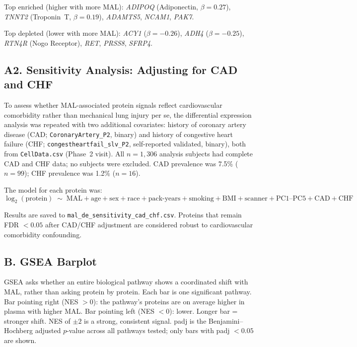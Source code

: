 \documentclass[11pt, letterpaper]{article}
\begin{document}
Top enriched (higher with more MAL):
\textit{ADIPOQ} (Adiponectin, $\beta = 0.27$),
\textit{TNNT2} (Troponin~T, $\beta = 0.19$),
\textit{ADAMTS5}, \textit{NCAM1}, \textit{PAK7}.

Top depleted (lower with more MAL):
\textit{ACY1} ($\beta = -0.26$), \textit{ADH4} ($\beta = -0.25$),
\textit{RTN4R} (Nogo Receptor), \textit{RET}, \textit{PRSS8},
\textit{SFRP4}.

\subsection*{A2. Sensitivity Analysis: Adjusting for CAD and CHF}

To assess whether MAL-associated protein signals reflect cardiovascular
comorbidity rather than mechanical lung injury per se, the differential
expression analysis was repeated with two additional covariates: history
of coronary artery disease (CAD; \texttt{CoronaryArtery\_P2}, binary)
and history of congestive heart failure (CHF;
\texttt{congestheartfail\_slv\_P2}, self-reported validated, binary),
both from \texttt{CellData.csv} (Phase~2 visit). All $n = 1{,}306$
analysis subjects had complete CAD and CHF data; no subjects were
excluded. CAD prevalence was 7.5\% ($n = 99$); CHF prevalence was
1.2\% ($n = 16$).

The model for each protein was:
\[
  \log_2(\text{protein}) \;\sim\; \text{MAL} + \text{age} + \text{sex}
  + \text{race} + \text{pack-years} + \text{smoking} + \text{BMI}
  + \text{scanner} + \text{PC1--PC5} + \text{CAD} + \text{CHF}
\]

Results are saved to \texttt{mal\_de\_sensitivity\_cad\_chf.csv}.
Proteins that remain FDR $< 0.05$ after CAD/CHF adjustment are
considered robust to cardiovascular comorbidity confounding.

\subsection*{B. GSEA Barplot}

GSEA asks whether an entire biological pathway shows a coordinated shift
with MAL, rather than asking protein by protein. Each bar is one
significant pathway. Bar pointing right (NES $> 0$): the pathway's
proteins are on average higher in plasma with higher MAL. Bar pointing
left (NES $< 0$): lower. Longer bar = stronger shift. NES of $\pm 2$
is a strong, consistent signal. padj is the Benjamini--Hochberg
adjusted $p$-value across all pathways tested; only bars with padj $<
0.05$ are shown.
\end{document}
